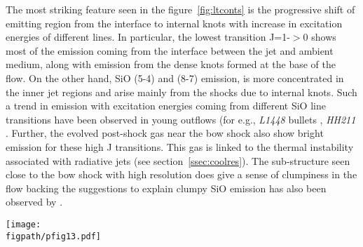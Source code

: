 \documentclass[useAMS,usenatbib]{mn2e}
\newcommand{\figpath}{/home/phybva/SiOJets_New/PAPER/NEWFIGS}
\begin{document}
The most striking feature seen in the figure~\ref{fig:ltconts} is the progressive shift of
emitting region from the interface to internal knots with increase in
excitation energies of different lines. In particular, the lowest
transition J=1-$>$0 shows most of the emission coming from the
interface between the jet and ambient medium, along with emission from
the dense knots formed at the base of the flow. On the other hand, SiO (5-4) and (8-7) emission, 
is more concentrated in the inner jet regions and arise mainly from
the shocks due to internal knots. Such a trend in emission with excitation energies coming from different SiO line transitions
have been observed in young outflows (for e.g., {\it{L1448}}
bullets \citep{Nisini:2007p13128}, {\it{HH211}}
\citep{Chandler:2001p14376, Nisini:2002p14418,
  Hirano:2006p14411}. Further, the evolved post-shock gas near the
bow shock also show bright emission for these high J transitions. 
This gas is linked to the thermal instability associated with
radiative jets (see section~\ref{ssec:coolres}). The sub-structure seen close to the
bow shock with high resolution does give a sense of clumpiness
in the flow backing the suggestions to explain clumpy SiO emission has
also been observed by \cite{Chandler:2001p14376}.
%

\begin{figure*}
 \texttt{[image: \\figpath/pfig13.pdf]}%
 \caption{Symmetrical contour maps of multi-line integrated SiO
   emission convolved with a 2\arcsec beam obtained using parameters of the reference run. The contour colors represent different intensities in Kelvins, i.e, 50.0({\it red}), 30.0({\it green}), 20.0({\it blue}), 5.0({\it
     magenta}), 2.0({\it cyan}), 0.1({\it black}).} 
\label{fig:ltconts}
\end{figure*}
\end{document}
